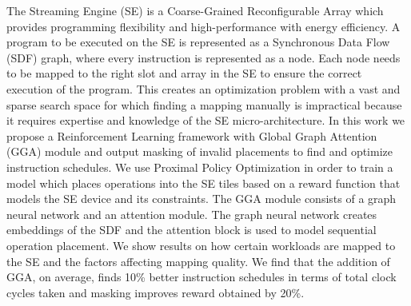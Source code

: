The Streaming Engine (SE) is a Coarse-Grained Reconfigurable Array which provides programming flexibility and high-performance with energy efficiency.
A program to be executed on the SE is represented as a Synchronous Data Flow (SDF) graph, where every instruction is represented as a node.
Each node needs to be mapped to the right slot and array in the SE to ensure the correct execution of the program.
This creates an optimization problem with a vast and sparse search space for which finding a mapping manually is impractical because it requires expertise and knowledge of the SE micro-architecture.
In this work we propose a Reinforcement Learning framework with Global Graph Attention (GGA) module and output masking of invalid placements to find and optimize instruction schedules.
We use Proximal Policy Optimization in order to train a model which places operations into the SE tiles based on a reward function that models the SE device and its constraints.
The GGA module consists of a graph neural network and an attention module. 
The graph neural network creates embeddings of the SDF and the attention block is used to model sequential operation placement. 
We show results on how certain workloads are mapped to the SE and the factors affecting mapping quality.
We find that the addition of GGA, on average, finds 10\% better instruction schedules in terms of total clock cycles taken and masking improves reward obtained by 20\%.
